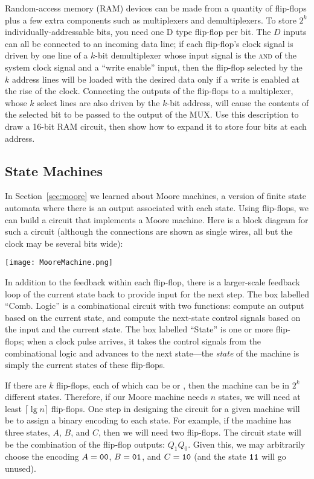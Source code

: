 \begin{exercises}
\item Random-access memory (RAM) devices can be made from a quantity of flip-flops plus a few extra components such as multiplexers and demultiplexers. To store $2^k$ individually-addressable bits, you need one D type flip-flop per bit. The $D$ inputs can all be connected to an incoming data line; if each flip-flop's clock signal is driven by one line of a $k$-bit demultiplexer whose input signal is the \textsc{and} of the system clock signal and a ``write enable'' input, then the flip-flop selected by the $k$ address lines will be loaded with the desired data only if a write is enabled at the rise of the clock. Connecting the outputs of the flip-flops to a multiplexer, whose $k$ select lines are also driven by the $k$-bit address, will cause the contents of the selected bit to be passed to the output of the MUX. Use this description to draw a 16-bit RAM circuit, then show how to expand it to store four bits at each address.
\end{exercises}

\subsection{State Machines}
In Section~\ref{sec:moore} we learned about Moore machines, a version of finite state automata where there is an output associated with each state. Using flip-flops, we can build a circuit that implements a Moore machine. Here is a block diagram for such a circuit (although the connections are shown as single wires, all but the clock may be several bits wide):
\begin{center}
\texttt{[image: MooreMachine.png]}
\end{center}
In addition to the feedback within each flip-flop, there is a larger-scale feedback loop of the current state back to provide input for the next step. The box labelled ``Comb. Logic'' is a combinational circuit with two functions: compute an output based on the current state, and compute the next-state control signals based on the input and the current state. The box labelled ``State'' is one or more flip-flops; when a clock pulse arrives, it takes the control signals from the combinational logic and advances to the next state---the \emph{state} of the machine is simply the current states of these flip-flops.

If there are $k$ flip-flops, each of which can be \0 or \1, then the machine can be in $2^k$ different states. Therefore, if our Moore machine needs $n$ states, we will need at least $\lceil\lg n\rceil$ flip-flops. One step in designing the circuit for a given machine will be to assign a binary encoding to each state. For example, if the machine has three states, $A$, $B$, and $C$, then we will need two flip-flops. The circuit state will be the combination of the flip-flop outputs: $Q_1Q_0$. Given this, we may arbitrarily choose the encoding $A=\mathtt{0}\mathtt{0}$, $B=\mathtt{0}\mathtt{1}$, and $C=\mathtt{1}\mathtt{0}$ (and the state $\mathtt{1}\mathtt{1}$ will go unused).


